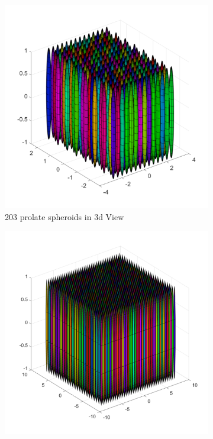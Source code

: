 \begin{figure}
        \centering
        \begin{subfigure}[b]{0.475\textwidth}
            \centering
            \includegraphics[width=\textwidth]{Images/Rods/SmallRods3d.pdf}
            \caption[]%
            {{\small 203 prolate spheroids in 3d View}}    
            \label{fig:mean and std of net14}
        \end{subfigure}
        \begin{subfigure}[b]{0.475\textwidth}  
            \centering 
            \includegraphics[width=\textwidth]{Images/Rods/LargeRods3d.pdf}

\end{subfigure}
\end{figure}
